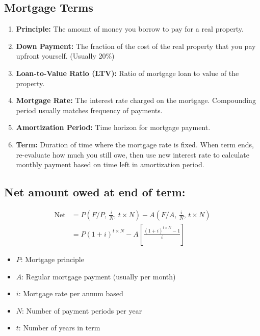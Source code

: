 \subsection{Mortgage Terms}
\begin{terminology}
    \begin{enumerate}
        \item \textbf{Principle:} The amount of money you borrow to pay for a real property.
        \item \textbf{Down Payment:} The fraction of the cost of the real property that you pay upfront yourself. (Usually 20\%)
        \item \textbf{Loan-to-Value Ratio (LTV):} Ratio of mortgage loan to value of the property.
        \item \textbf{Mortgage Rate:} The interest rate charged on the mortgage. Compounding period usually matches frequency of payments.
        \item \textbf{Amortization Period:} Time horizon for mortgage payment. 
        \item \textbf{Term:} Duration of time where the mortgage rate is fixed. When term ends, re-evaluate how much you still owe, then use new interest rate to calculate monthly payment based on time left in amortization period. 
    \end{enumerate}
\end{terminology}

\subsection{Net amount owed at end of term:}
\begin{definition}
    \begin{equation}
        \begin{aligned}
            \text{Net} &= P \left(F/P, \, \frac{i}{N}, \, t \times N\right) - A \left(F/A, \, \frac{i}{N}, \, t \times N\right) \\
                       &= P (1 + i)^{t \times N} - A \left[\frac{(1 + i)^{t \times N} - 1}{i}\right]
        \end{aligned}
    \end{equation}
    \begin{itemize}
        \item $P$: Mortgage principle
        \item $A$: Regular mortgage payment (usually per month)
        \item $i$: Mortgage rate per annum based
        \item $N$: Number of payment periods per year
        \item $t$: Number of years in term
    \end{itemize}
\end{definition}

